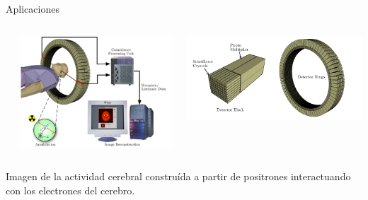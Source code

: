\documentclass{beamer}
\begin{document}
\begin{frame}{Aplicaciones}
\begin{columns}
\begin{column}{.3\linewidth}
\end{column}
\begin{column}{.3\linewidth}\centering
\includegraphics[width=\linewidth]{pet2.png}\par 
\end{column}
\begin{column}{.3\linewidth}\centering
\includegraphics[width=\linewidth]{pet3.png}\par 

\end{column}
\end{columns}
\bigskip
Imagen de la actividad cerebral construída a partir de positrones interactuando con los electrones del cerebro.
\end{frame}
\end{document}
